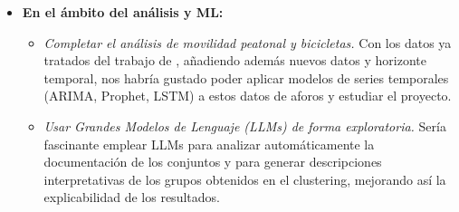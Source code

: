 \begin{itemize}
\begin{itemize}
		\item \emph{Probar procesamiento distribuido y en tiempo real.} Utilizar servicios como AWS Glue (Spark) o Dataproc en GCP, así como herramientas de análisis en tiempo real, para comprobar la utilidad de los datos en tiempo real sería un gran punto a ampliar en el proyecto.
		
		\item \emph{Completar el despliegue serverless.} En este trabajo se descartaron tanto Cloud Run como Cloud Functions; con configuración adicional es técnicamente viable, y merecería la pena intentarlo en una siguiente iteración.
		
		\item \emph{Construir un dashboard interactivo para los resultados.} Para que otros investigadores o el público general pudieran explorar los datos y conclusiones de forma visual e intuitiva, sería muy útil desarrollar una interfaz con herramientas nativas en la nube como un \textit{Apache Superset} gestionado o \textit{Looker Studio}.
	\end{itemize}
	
	\item \textbf{En el ámbito del análisis y ML:}
	\begin{itemize}
		\item \emph{Completar el análisis de movilidad peatonal y bicicletas.} Con los datos ya tratados del trabajo de \citep{SaizSantos2023}, añadiendo además nuevos datos y horizonte temporal, nos habría gustado poder aplicar modelos de series temporales (ARIMA, Prophet, LSTM) a estos datos de aforos y estudiar el proyecto.
		
		\item \emph{Usar Grandes Modelos de Lenguaje (LLMs) de forma exploratoria.} Sería fascinante emplear LLMs para analizar automáticamente la documentación de los conjuntos y para generar descripciones interpretativas de los grupos obtenidos en el clustering, mejorando así la explicabilidad de los resultados.
		

\end{itemize}
\end{itemize}
